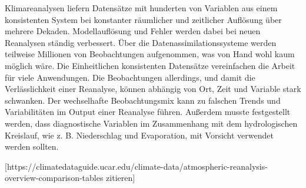 \documentclass[]{article}
\begin{document}
Klimareanalysen liefern Datensätze mit hunderten von Variablen aus einem konsistenten System bei konstanter räumlicher und zeitlicher Auflösung über mehrere Dekaden. Modellauflösung und Fehler werden dabei bei neuen Reanalysen ständig verbessert. Über die Datenassimilationssysteme werden teilweise Millionen von Beobachtungen aufgenommen, was von Hand wohl kaum möglich wäre. Die Einheitlichen konsistenten Datensätze vereinfachen die Arbeit für viele Anwendungen. Die Beobachtungen allerdings, und damit die Verlässlichkeit einer Reanalyse, können abhängig von Ort, Zeit und Variable stark schwanken. Der wechselhafte Beobachtungsmix kann zu falschen Trends und Variabilitäten im Output einer Reanalyse führen. Außerdem musste festgestellt werden, dass diagnostische Variablen im Zusammenhang mit dem hydrologischen Kreislauf, wie z. B. Niederschlag und Evaporation, mit Vorsicht verwendet werden sollten.

[https://climatedataguide.ucar.edu/climate-data/atmospheric-reanalysis-overview-comparison-tables zitieren]
\end{document}
